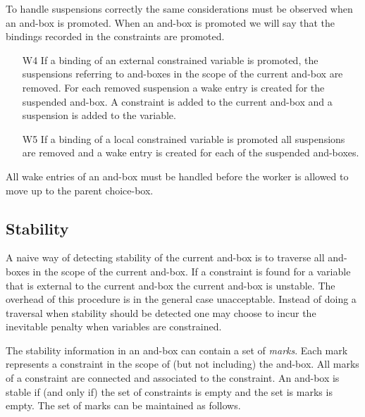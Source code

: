 To handle suspensions correctly the same considerations must be observed
when an and-box is promoted. When an and-box is promoted we will say
that the bindings recorded in the constraints are promoted.

\begin{itemize}

\item[W4] If a binding of an external constrained variable is promoted,
the suspensions referring to and-boxes in the scope of the current
and-box are removed. For each removed suspension a wake entry is
created for the suspended and-box. A constraint is added to the
current and-box and a suspension is added to the variable.

\item[W5] If a binding of a local constrained variable is promoted 
all suspensions are removed and a wake entry is created for each of the
suspended and-boxes. 

\end{itemize}

All wake entries of an and-box must be handled before the worker is
allowed to move up to the parent choice-box.


\subsection*{Stability} \label{absstab}

A naive way of detecting stability of the current and-box is to
traverse all and-boxes in the scope of the current and-box. If a
constraint is found for a variable that is external to the current
and-box the current and-box is unstable. The overhead of this
procedure is in the general case unacceptable. Instead of doing a
traversal when stability should be detected one may choose to incur the
inevitable penalty when variables are constrained.

The stability information in an and-box can contain a set of {\em
marks}. Each mark represents a constraint in the scope of (but not
including) the and-box. All marks of a constraint are connected and 
associated to the constraint.  An and-box is stable if (and
only if) the set of constraints is empty and the set is marks is
empty. The set of marks can be maintained as follows.


